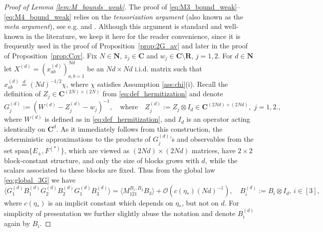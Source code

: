 \documentclass[10pt]{amsart}
\numberwithin{equation}{section}
\newcommand{\R}{\mathbf{R}}
\newcommand{\C}{\mathbf{C}}
\newcommand{\N}{\mathbf{N}}
\begin{document}
\begin{proof}[Proof of Lemma \ref{lem:M_bounds_weak}] 
The proof of \eqref{eq:M3_bound_weak}--\eqref{eq:M4_bound_weak} relies on the \emph{tensorization argument} (also known as the \emph{meta argument}), see e.g. \cite[Section~2.6]{Najim16} and \cite[Proof of Lemma~D.1]{non-herm_overlaps}. Although this argument is standard and well-known in the literature, we keep it here for the reader convenience, since it is frequently used in the proof of Proposition~\ref{prop:2G_av} and later in the proof of Proposition~\ref{prop:Cov}. Fix $N\in\N$, $z_j\in\C$ and $w_j\in\C\setminus\R$, $j=1,2$.  For $d\in\N$ let $X^{(d)}=(x^{(d)}_{ab})_{a,b=1}^{Nd}$ be an $Nd\times Nd$ i.i.d. matrix such that $x^{(d)}_{ab}\stackrel{d}{=} (Nd)^{-1/2}\chi$, where $\chi$ satisfies Assumption \ref{ass:chi}(i). Recall the definition of $Z_j\in \C^{(2N)\times (2N)}$ from \eqref{eq:def_hermitization} and denote
\begin{equation}
G_j^{(d)}:=\left(W^{(d)}-Z_j^{(d)}-w_j\right)^{-1},\quad \text{where}\quad Z_j^{(d)}:=Z_j\otimes I_d\in\C^{(2Nd)\times (2Nd)},\,\,  j=1,2.,
\end{equation} 
where $W^{(d)}$ is defined as in \eqref{eq:def_hermitization}, and $I_d$ is an operator acting identically on $\C^d$. As it immediately follows from this construction, the deterministic approximations to the products of $G_j^{(d)}$'s and observables from the set $\mathrm{span}\{E_{\pm},F^{(*)}\}$, which are viewed as $(2Nd)\times (2Nd)$ matrices, have $2\times 2$ block-constant structure, and only the size of blocks grows with $d$, while the scalars associated to these blocks are fixed. Thus from the global law \eqref{eq:global_3G} we have
\begin{equation}
\big\langle G_1^{(d)}B_1^{(d)}G_2^{(d)}B_2^{(d)}G_1^{(d)}B_3^{(d)}\big\rangle = \langle M_{121}^{B_1,B_2}B_3\rangle + \mathcal{O}\left(c(\eta_*)(Nd)^{-1}\right),\quad B_i^{(d)}:=B_i\otimes I_d,\, i\in[3],
\label{eq:meta_3G}
\end{equation}
where $c(\eta_*)$ is an implicit constant which depends on $\eta_*$, but not on $d$. For simplicity of presentation we further slightly abuse the notation and denote $B_i^{(d)}$ again by $B_i$. 



\end{proof}
\end{document}
